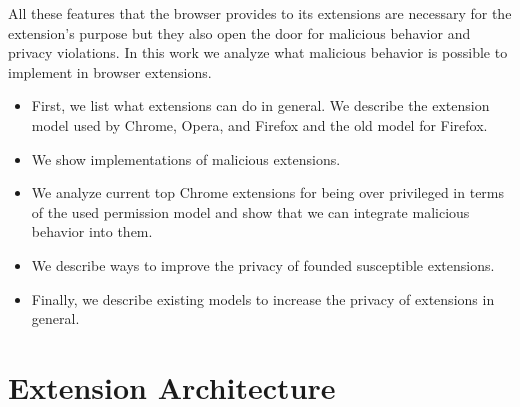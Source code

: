 \documentclass[article,colorback,accentcolor=tud9c,type=bsc]{tudthesis}
\let\stdsection\section
\renewcommand\section{\newpage\stdsection}
\begin{document}
	All these features that the browser provides to its extensions are necessary for the extension's purpose but they also open the door for malicious behavior and privacy violations. In this work we analyze what malicious behavior is possible to implement in browser extensions. 
	\begin{itemize}
	\itemsep-5px
	\item First, we list what extensions can do in general. We describe the extension model used by Chrome, Opera, and Firefox and the old model for Firefox.
	\item We show implementations of malicious extensions. 
	\item We analyze current top Chrome extensions for being over privileged in terms of the used permission model and show that we can integrate malicious behavior into them.
	\item We describe ways to improve the privacy of founded susceptible extensions. 
	\item Finally, we describe existing models to increase the privacy of extensions in general. 
	\end{itemize}
	
	
\section{Extension Architecture}
\end{document}

